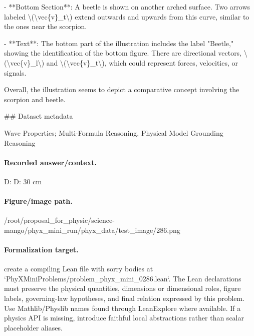 - **Bottom Section**: A beetle is shown on another arched surface. Two arrows labeled \textbackslash{}(\textbackslash{}vec\{v\}\_t\textbackslash{}) extend outwards and upwards from this curve, similar to the ones near the scorpion.

- **Text**: The bottom part of the illustration includes the label "Beetle," showing the identification of the bottom figure. There are directional vectors, \textbackslash{}(\textbackslash{}vec\{v\}\_l\textbackslash{}) and \textbackslash{}(\textbackslash{}vec\{v\}\_t\textbackslash{}), which could represent forces, velocities, or signals.

Overall, the illustration seems to depict a comparative concept involving the scorpion and beetle.

\#\# Dataset metadata

Wave Properties; Multi-Formula Reasoning, Physical Model Grounding Reasoning

\paragraph{Recorded answer/context.}
D: D: 30 cm

\paragraph{Figure/image path.}
/root/proposal\_for\_physic/science-mango/phyx\_mini\_run/phyx\_data/test\_image/286.png

\paragraph{Formalization target.}
create a compiling Lean file with sorry bodies at `PhyXMiniProblems/problem\_phyx\_mini\_0286.lean`. The Lean declarations must preserve the physical quantities, dimensions or dimensional roles, figure labels, governing-law hypotheses, and final relation expressed by this problem.
Use Mathlib/Physlib names found through LeanExplore where available. If a physics API is missing, introduce faithful local abstractions rather than scalar placeholder aliases.

